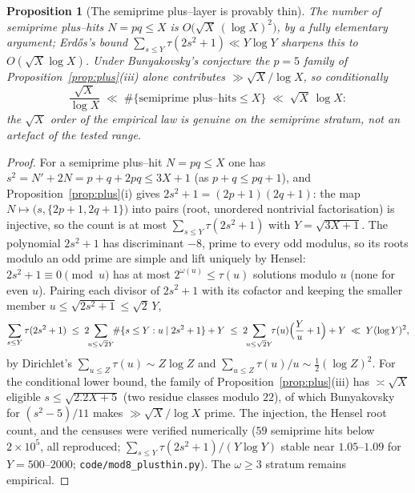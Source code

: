 \documentclass[11pt]{article}
\newtheorem{proposition}[theorem]{Proposition}
\theoremstyle{definition}
\begin{document}
\begin{proposition}[The semiprime plus--layer is provably thin]\label{prop:plusthin}
The number of semiprime plus--hits $N=pq\le X$ is $O\bigl(\sqrt X\,(\log X)^2\bigr)$, by a fully
elementary argument; Erd\H{o}s's bound $\sum_{s\le Y}\tau(2s^2+1)\ll Y\log Y$ \cite{Erdos1952}
sharpens this to $O(\sqrt X\log X)$. Under Bunyakovsky's conjecture the $p=5$ family of
Proposition~\ref{prop:plus}(iii) alone contributes $\gg\sqrt X/\log X$, so conditionally
\[ \frac{\sqrt X}{\log X}\;\ll\;\#\{\text{semiprime plus--hits}\le X\}\;\ll\;\sqrt X\,\log X: \]
the $\sqrt X$ order of the empirical law is genuine on the semiprime stratum, not an artefact of the
tested range.
\end{proposition}
\begin{proof}
For a semiprime plus--hit $N=pq\le X$ one has $s^2=N'+2N=p+q+2pq\le3X+1$ (as $p+q\le pq+1$), and
Proposition~\ref{prop:plus}(i) gives $2s^2+1=(2p+1)(2q+1)$: the map
$N\mapsto\bigl(s,\{2p+1,2q+1\}\bigr)$ into pairs (root, unordered nontrivial factorisation) is
injective, so the count is at most $\sum_{s\le Y}\tau(2s^2+1)$ with $Y=\sqrt{3X+1}$. The polynomial
$2s^2+1$ has discriminant $-8$, prime to every odd modulus, so its roots modulo an odd prime are
simple and lift uniquely by Hensel: $2s^2+1\equiv0\pmod u$ has at most $2^{\omega(u)}\le\tau(u)$
solutions modulo $u$ (none for even $u$). Pairing each divisor of $2s^2+1$ with its cofactor and
keeping the smaller member $u\le\sqrt{2s^2+1}\le\sqrt2\,Y$,
\[ \sum_{s\le Y}\tau(2s^2+1)\;\le\;2\!\!\sum_{u\le\sqrt2Y}\!\!\#\{s\le Y:u\mid2s^2+1\}+Y
\;\le\;2\!\!\sum_{u\le\sqrt2Y}\!\!\tau(u)\Bigl(\frac Yu+1\Bigr)+Y\;\ll\;Y(\log Y)^2, \]
by Dirichlet's $\sum_{u\le Z}\tau(u)\sim Z\log Z$ and $\sum_{u\le Z}\tau(u)/u\sim\tfrac12(\log Z)^2$.
For the conditional lower bound, the family of Proposition~\ref{prop:plus}(iii) has $\asymp\sqrt X$
eligible $s\le\sqrt{2.2X+5}$ (two residue classes modulo $22$), of which Bunyakovsky for
$(s^2-5)/11$ makes $\gg\sqrt X/\log X$ prime. The injection, the Hensel root count, and the censuses
were verified numerically ($59$ semiprime hits below $2\times10^5$, all reproduced;
$\sum_{s\le Y}\tau(2s^2+1)/(Y\log Y)$ stable near $1.05$--$1.09$ for $Y=500$--$2000$;
\texttt{code/mod8\_plusthin.py}). The $\omega\ge3$ stratum remains empirical.
\end{proof}
\end{document}
